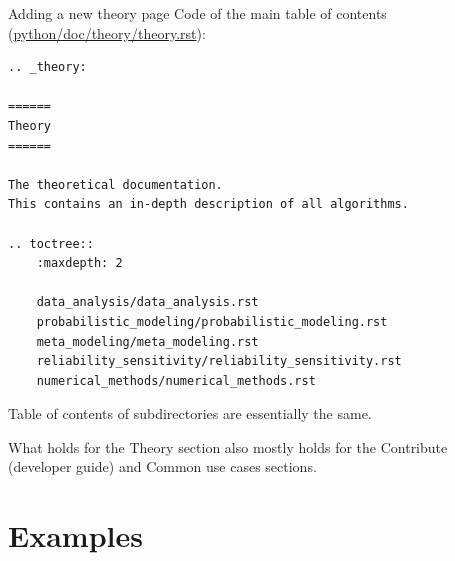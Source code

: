 \documentclass[8pt]{beamer}
\begin{document}
\begin{frame}[fragile]{Adding a new theory page}
Code of the main table of contents (\href{https://github.com/openturns/openturns/blob/master/python/doc/theory/theory.rst}{python/doc/theory/theory.rst}):

\lstset{style=mystyle}

\begin{lstlisting}
.. _theory:

======
Theory
======

The theoretical documentation.
This contains an in-depth description of all algorithms.

.. toctree::
    :maxdepth: 2

    data_analysis/data_analysis.rst
    probabilistic_modeling/probabilistic_modeling.rst
    meta_modeling/meta_modeling.rst
    reliability_sensitivity/reliability_sensitivity.rst
    numerical_methods/numerical_methods.rst
\end{lstlisting}
Table of contents of subdirectories are essentially the same.

What holds for the \alert{Theory} section also mostly holds for the \alert{Contribute} (developer guide) and \alert{Common use cases} sections.
\end{frame}



\section{Examples}

\end{document}
